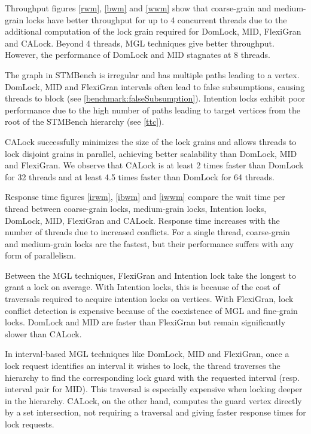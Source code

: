 Throughput figures \cref{rwm}, \cref{bwm} and \cref{wwm} show that coarse-grain and medium-grain locks have better throughput for up to 4 concurrent threads due to the additional computation of the lock grain required for DomLock, MID, FlexiGran and CALock. Beyond 4 threads, MGL techniques give better throughput. However, the performance of DomLock and MID stagnates at 8 threads.

The graph in STMBench is irregular and has multiple paths leading to a vertex. DomLock, MID and FlexiGran intervals often lead to false subsumptions, causing threads to block (see \cref{benchmark:falseSubsumption}). Intention locks exhibit poor performance due to the high number of paths leading to target vertices from the root of the STMBench hierarchy (see \cref{ttc}).

CALock successfully minimizes the size of the lock grains and allows threads to lock disjoint grains in parallel, achieving better scalability than DomLock, MID and FlexiGran.
We observe that CALock is at least 2 times faster than DomLock for 32 threads and at least 4.5 times faster than DomLock for 64 threads.


Response time figures \cref{irwm}, \cref{ibwm} and \cref{iwwm} compare the wait time per thread between coarse-grain locks, medium-grain locks, Intention locks,  DomLock, MID, FlexiGran and CALock.
Response time increases with the number of threads due to increased conflicts.
For a single thread, coarse-grain and medium-grain locks are the fastest, but their performance suffers with any form of parallelism. 

Between the MGL techniques, FlexiGran and Intention lock take the longest to grant a lock on average. With Intention locks, this is because of the cost of traversals required to acquire intention locks on vertices. With FlexiGran, lock conflict detection is expensive because of the coexistence of MGL and fine-grain locks. DomLock and MID are faster than FlexiGran but remain significantly slower than CALock. 

In interval-based MGL techniques like DomLock, MID and FlexiGran, once a lock request identifies an interval it wishes to lock, the thread traverses the hierarchy to find the corresponding lock guard with the requested interval (resp. interval pair for MID). This traversal is especially expensive when locking deeper in the hierarchy. CALock, on the other hand, computes the guard vertex directly by a set intersection, not requiring a traversal and giving faster response times for lock requests. 

